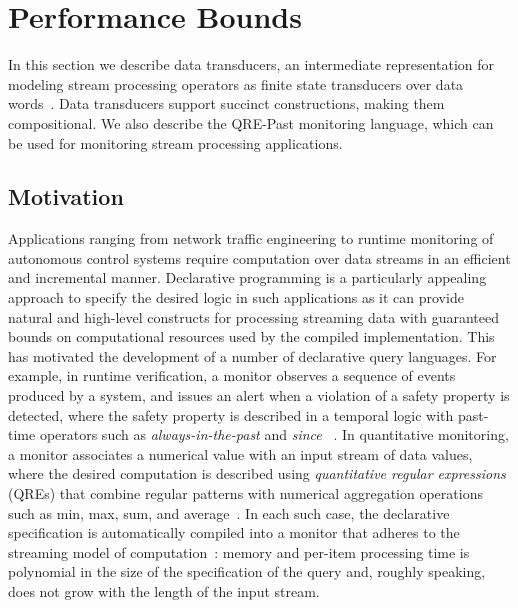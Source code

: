 \chapter{Performance Bounds}
\label{cha:monitoring}

In this section we describe data transducers,
an intermediate representation for modeling
stream processing operators as finite state transducers
over data words~.
Data transducers support succinct constructions, making them
compositional.
We also describe the QRE-Past monitoring language, which
can be used for monitoring stream processing applications.

\section{Motivation}

Applications ranging from network traffic engineering to runtime monitoring of autonomous control systems
require computation over data streams in an efficient and incremental manner.
Declarative programming is a particularly appealing approach to specify the desired logic in such
applications as it can provide natural and high-level constructs for processing streaming data
with guaranteed bounds on computational resources used by the compiled implementation.
This has motivated the development of a number of declarative query languages.
For example, in runtime verification, a monitor observes a sequence of events produced by
a system, and issues an alert when a violation of a safety property is detected, where the safety property
is described in a temporal logic with past-time operators such as \emph{always-in-the-past} and \emph{since}
~\cite{manna2012temporal,havelund2004efficient}.
In quantitative monitoring, a monitor associates a numerical value with an input stream of data values,
where the desired computation is described using \emph{quantitative regular expressions} (QREs) that combine
regular patterns with numerical aggregation operations such as min, max, sum, and average~\cite{QRE,StreamQRE,YLMMAL2017NQRE}.
In each such case, the declarative specification is automatically compiled into a monitor that
adheres to the streaming model of computation~\cite{M2005DS}: memory and per-item
processing time is polynomial in the size of the specification of the query and, roughly speaking,
does not grow with the length of the input stream.

